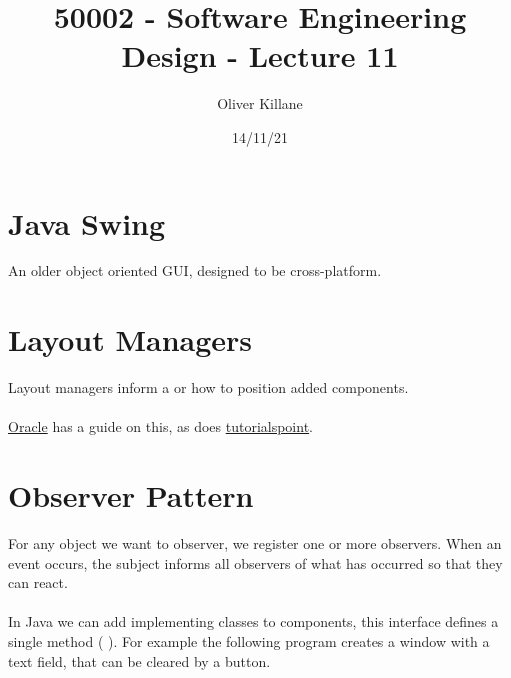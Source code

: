 \documentclass{report}
\title{50002 - Software Engineering Design - Lecture 11}
\author{Oliver Killane}
\date{14/11/21}
\begin{document}
    \maketitle

    \section*{Java Swing}
        An older object oriented GUI, designed to be cross-platform.


    \section*{Layout Managers}
        Layout managers inform a  or  how to position added components.
        \\
        \\ \href{https://docs.oracle.com/javase/tutorial/uiswing/layout/visual.html}{Oracle} has a guide on this, as does \href{https://www.tutorialspoint.com/swing/swing_layouts.htm}{tutorialspoint}.
    
    \section*{Observer Pattern}
        For any object we want to observer, we register one or more observers. When an event occurs, the subject informs all observers of what has occurred so that they can react.
        \\
        \\ In Java we can add  implementing classes to components, this interface defines a single method ( ).
        For example the following program creates a window with a text field, that can be cleared by a button.
\end{document}
